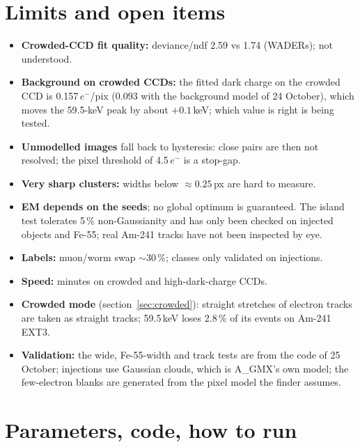\documentclass[11pt,a4paper]{article}
\newcommand{\el}{\ensuremath{e^-}}
\newcommand{\AGMX}{A\_GMX}
\begin{document}
\section{Limits and open items}
\begin{itemize}
\item \textbf{Crowded-CCD fit quality:} deviance/ndf 2.59 vs 1.74 (WADERs); not understood.
\item \textbf{Background on crowded CCDs:} the fitted dark charge on the crowded CCD is 0.157\,\el/pix (0.093 with the background
model of 24 October), which moves the 59.5-keV peak by about $+0.1$\,keV; which value is right is being tested.
\item \textbf{Unmodelled images} fall back to hysteresis: close pairs are then not resolved; the pixel threshold of 4.5\,\el{}
is a stop-gap.
\item \textbf{Very sharp clusters:} widths below $\approx0.25$\,px are hard to measure.
\item \textbf{EM depends on the seeds}; no global optimum is guaranteed. The island test tolerates 5\,\% non-Gaussianity and has
only been checked on injected objects and Fe-55; real Am-241 tracks have not been inspected by eye.
\item \textbf{Labels:} muon/worm swap $\sim$30\,\%; classes only validated on injections.
\item \textbf{Speed:} minutes on crowded and high-dark-charge CCDs.
\item \textbf{Crowded mode} (section~\ref{sec:crowded}): straight stretches of electron tracks are taken as straight tracks;
59.5\,keV loses 2.8\,\% of its events on Am-241 EXT3.
\item \textbf{Validation:} the wide, Fe-55-width and track tests are from the code of 25 October; injections use Gaussian clouds,
which is \AGMX's own model; the few-electron blanks are generated from the pixel model the finder assumes.
\end{itemize}

\section{Parameters, code, how to run}
\end{document}
